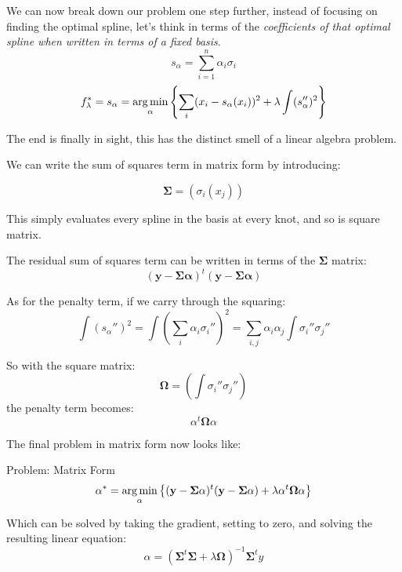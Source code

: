 \begin{frame}
  We can now break down our problem one step further, instead of focusing on finding the optimal spline, let's think in terms of the \textit{coefficients of that optimal spline when written in terms of a fixed basis}.
    $$ s_{\alpha} = \sum_{i=1}^{n} \alpha_i \sigma_i $$
    $$ f_{\lambda}^* = s_{\alpha} = \operatorname*{arg\,min}_{\alpha} \left\{ \sum_i (x_i - s_{\alpha}(x_i))^2 + \lambda \int (s_{\alpha}'')^2 \right\} $$
\end{frame}
%
%
\begin{frame}
  The end is finally in sight, this has the distinct smell of a linear algebra problem. 
\end{frame}
%
%
\begin{frame}
  We can write the sum of squares term in matrix form by introducing:
  
  $$ \mathbf{\Sigma} = \left( \sigma_i (x_j) \right) $$
  
  This simply evaluates every spline in the basis at every knot, and so is square matrix.
\end{frame}
%
%
\begin{frame}
  The residual sum of squares term can be written in terms of the $\mathbf{\Sigma}$ matrix:
  $$ (\mathbf{y} - \mathbf{\Sigma} \mathbf{\alpha})^{t}(\mathbf{y} - \mathbf{\Sigma} \mathbf{\alpha})$$
\end{frame}
%
%
\begin{frame}
  As for the penalty term, if we carry through the squaring:
  $$ \int (s_{\alpha}'')^2 = \int \left( \sum_i \alpha_i \sigma_i'' \right)^2 = \sum_{i,j} \alpha_i \alpha_j \int \sigma_i'' \sigma_j'' $$
\end{frame}
%
%
\begin{frame}
  So with the square matrix:
  $$ \mathbf{\Omega} = \left( \int \sigma_i'' \sigma_j'' \right) $$
  the penalty term becomes:
  $$ \alpha^t \mathbf{\Omega} \alpha $$
\end{frame}
%
%
\begin{frame}
  The final problem in matrix form now looks like:
  \begin{block}{Problem: Matrix Form}
    $$\alpha^* = \operatorname*{arg\,min}_{\alpha} \left\{ (\mathbf{y} - \mathbf{\Sigma} \mathbf{\alpha})^{t}(\mathbf{y} - \mathbf{\Sigma} \mathbf{\alpha}) + \lambda \alpha^t \mathbf{\Omega} \alpha \right\} $$ 
  \end{block}
  Which can be solved by taking the gradient, setting to zero, and solving the resulting linear equation:
  $$ \alpha = ( \mathbf{\Sigma}^t \mathbf{\Sigma} + \lambda \mathbf{\Omega} )^{-1} \mathbf{\Sigma}^t y $$
\end{frame}

